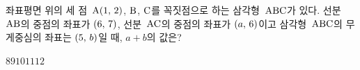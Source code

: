 좌표평면 위의 세 점~$\mathrm{A}(1,\mkern3mu 2)$, $\mathrm{B}$, $\mathrm{C}$를 꼭짓점으로 하는 삼각형~$\mathrm{ABC}$가 있다. 선분~$\mathrm{AB}$의 중점의 좌표가 $(6,\mkern3mu 7)$, 선분~$\mathrm{AC}$의 중점의 좌표가 $(a,\mkern3mu 6)$이고 삼각형~$\mathrm{ABC}$의 무게중심의 좌표는 $(5,\mkern3mu b)$일 때, $a+b$의 값은?
\begin{choices32}{$8$}{$9$}{$10$}{$11$}{$12$}\end{choices32}

